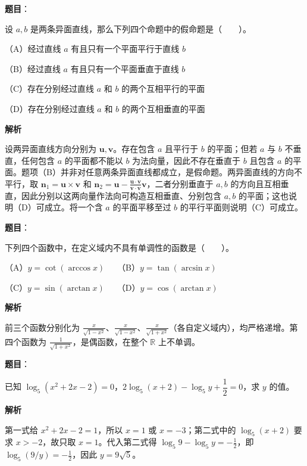 \begin{answer}

\textbf{题目}：

设 $a,b$ 是两条异面直线，那么下列四个命题中的假命题是\mbox{（　　）}。

（A）经过直线 $a$ 有且只有一个平面平行于直线 $b$

（B）经过直线 $a$ 有且只有一个平面垂直于直线 $b$

（C）存在分别经过直线 $a$ 和 $b$ 的两个互相平行的平面

（D）存在分别经过直线 $a$ 和 $b$ 的两个互相垂直的平面

\textbf{解析}

设两异面直线方向分别为 $\mathbf u,\mathbf v$。存在包含 $a$ 且平行于 $b$ 的平面；但若 $a$ 与 $b$ 不垂直，任何包含 $a$ 的平面都不能以 $b$ 为法向量，因此不存在垂直于 $b$ 且包含 $a$ 的平面。题项（B）并非对任意两条异面直线都成立，是假命题。两异面直线的方向不平行，取 $\mathbf n_1=\mathbf u\times\mathbf v$ 和 $\mathbf n_2=\mathbf u-\frac{\mathbf u\cdot\mathbf v}{\mathbf v\cdot\mathbf v}\mathbf v$，二者分别垂直于 $a,b$ 的方向且互相垂直，因此分别以这两向量作法向可构造互相垂直、分别包含 $a,b$ 的平面；这也说明（D）可成立。将一个含 $a$ 的平面平移至过 $b$ 的平行平面则说明（C）可成立。


\end{answer}
\begin{answer}

\textbf{题目}：

下列四个函数中，在定义域内不具有单调性的函数是\mbox{（　　）}。

（A）$y=\cot(\arccos x)$　　（B）$y=\tan(\arcsin x)$

（C）$y=\sin(\arctan x)$　　（D）$y=\cos(\arctan x)$

\textbf{解析}

前三个函数分别化为 $\frac{x}{\sqrt{1-x^2}}$、$\frac{x}{\sqrt{1-x^2}}$、$\frac{x}{\sqrt{1+x^2}}$（各自定义域内），均严格递增。第四个函数为 $\frac1{\sqrt{1+x^2}}$，是偶函数，在整个 $\mathbb R$ 上不单调。


\end{answer}
\begin{answer}

\textbf{题目}：

已知 $\log_5(x^2+2x-2)=0$，$2\log_5(x+2)-\log_5 y+\dfrac12=0$，求 $y$ 的值。

\textbf{解析}

第一式给 $x^2+2x-2=1$，所以 $x=1$ 或 $x=-3$；第二式中的 $\log_5(x+2)$ 要求 $x>-2$，故只取 $x=1$。代入第二式得 $\log_5 9-\log_5y=-\frac12$，即 $\log_5(9/y)=-\frac12$，因此 $y=9\sqrt5$。


\end{answer}
